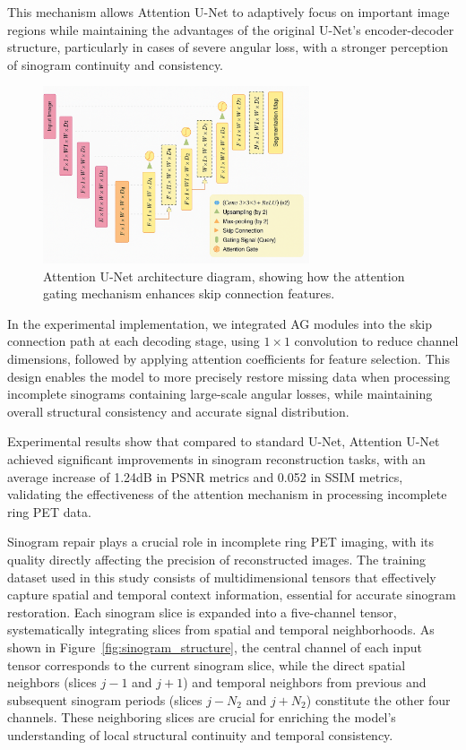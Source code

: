 \documentclass[
reprint,
superscriptaddress,
nofootinbib,
amsmath,amssymb,
aps,
prd,
]{revtex4-2}
\begin{document}
This mechanism allows Attention U-Net to adaptively focus on important image regions while maintaining the advantages of the original U-Net's encoder-decoder structure, particularly in cases of severe angular loss, with a stronger perception of sinogram continuity and consistency.
\begin{figure}[htbp]
    \centering
    \vspace{-.2cm}
    \includegraphics[width=0.7\textwidth]{Images/Unet.png}
    \vspace{-.3cm}
    \caption{Attention U-Net architecture diagram, showing how the attention gating mechanism enhances skip connection features.}
    \label{fig:unet_structure}
\end{figure}
In the experimental implementation, we integrated AG modules into the skip connection path at each decoding stage, using $1\times1$ convolution to reduce channel dimensions, followed by applying attention coefficients for feature selection. This design enables the model to more precisely restore missing data when processing incomplete sinograms containing large-scale angular losses, while maintaining overall structural consistency and accurate signal distribution.

Experimental results show that compared to standard U-Net, Attention U-Net achieved significant improvements in sinogram reconstruction tasks, with an average increase of 1.24dB in PSNR metrics and 0.052 in SSIM metrics, validating the effectiveness of the attention mechanism in processing incomplete ring PET data.

Sinogram repair plays a crucial role in incomplete ring PET imaging, with its quality directly affecting the precision of reconstructed images. The training dataset used in this study consists of multidimensional tensors that effectively capture spatial and temporal context information, essential for accurate sinogram restoration. Each sinogram slice is expanded into a five-channel tensor, systematically integrating slices from spatial and temporal neighborhoods. As shown in Figure~\ref{fig:sinogram_structure}, the central channel of each input tensor corresponds to the current sinogram slice, while the direct spatial neighbors (slices $j-1$ and $j+1$) and temporal neighbors from previous and subsequent sinogram periods (slices $j-N_2$ and $j+N_2$) constitute the other four channels. These neighboring slices are crucial for enriching the model's understanding of local structural continuity and temporal consistency.
\end{document}
